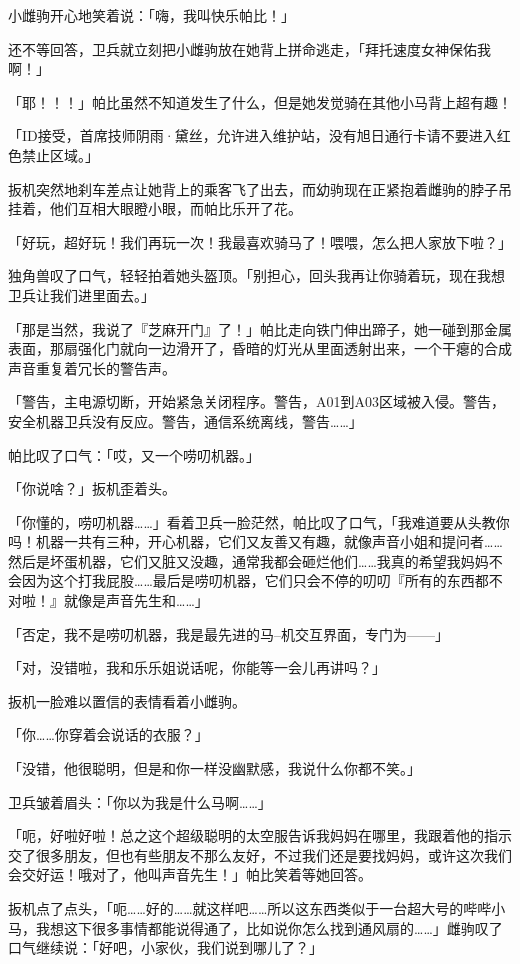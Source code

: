 小雌驹开心地笑着说：「嗨，我叫快乐帕比！」

还不等回答，卫兵就立刻把小雌驹放在她背上拼命逃走，「拜托速度女神保佑我啊！」

「耶！！！」帕比虽然不知道发生了什么，但是她发觉骑在其他小马背上超有趣！

「{\mtzh ID接受，首席技师阴雨·黛丝，允许进入维护站，没有旭日通行卡请不要进入红色禁止区域。}」

扳机突然地刹车差点让她背上的乘客飞了出去，而幼驹现在正紧抱着雌驹的脖子吊挂着，他们互相大眼瞪小眼，而帕比乐开了花。

「好玩，超好玩！我们再玩一次！我最喜欢骑马了！喂喂，怎么把人家放下啦？」

独角兽叹了口气，轻轻拍着她头盔顶。「别担心，回头我再让你骑着玩，现在我想卫兵让我们进里面去。」

「那是当然，我说了『芝麻开门』了！」帕比走向铁门伸出蹄子，她一碰到那金属表面，那扇强化门就向一边滑开了，昏暗的灯光从里面透射出来，一个干瘪的合成声音重复着冗长的警告声。

「{\mtzh 警告，主电源切断，开始紧急关闭程序。警告，A01到A03区域被入侵。警告，安全机器卫兵没有反应。警告，通信系统离线，警告……}」

帕比叹了口气：「哎，又一个唠叨机器。」

「你说啥？」扳机歪着头。

「你懂的，唠叨机器……」看着卫兵一脸茫然，帕比叹了口气，「我难道要从头教你吗！机器一共有三种，开心机器，它们又友善又有趣，就像声音小姐和提问者……然后是坏蛋机器，它们又脏又没趣，通常我都会砸烂他们……我真的希望我妈妈不会因为这个打我屁股……最后是唠叨机器，它们只会不停的叨叨『所有的东西都不对啦！』就像是声音先生和……」

「{\mtzh 否定，我不是唠叨机器，我是最先进的马--机交互界面，专门为——}」

「对，没错啦，我和乐乐姐说话呢，你能等一会儿再讲吗？」

扳机一脸难以置信的表情看着小雌驹。

「你……你穿着会说话的衣服？」

「没错，他很聪明，但是和你一样没幽默感，我说什么你都不笑。」

卫兵皱着眉头：「你以为我是什么马啊……」

「呃，好啦好啦！总之这个超级聪明的太空服告诉我妈妈在哪里，我跟着他的指示交了很多朋友，但也有些朋友不那么友好，不过我们还是要找妈妈，或许这次我们会交好运！哦对了，他叫声音先生！」帕比笑着等她回答。

扳机点了点头，「呃……好的……就这样吧……所以这东西类似于一台超大号的哔哔小马，我想这下很多事情都能说得通了，比如说你怎么找到通风扇的……」雌驹叹了口气继续说：「好吧，小家伙，我们说到哪儿了？」

